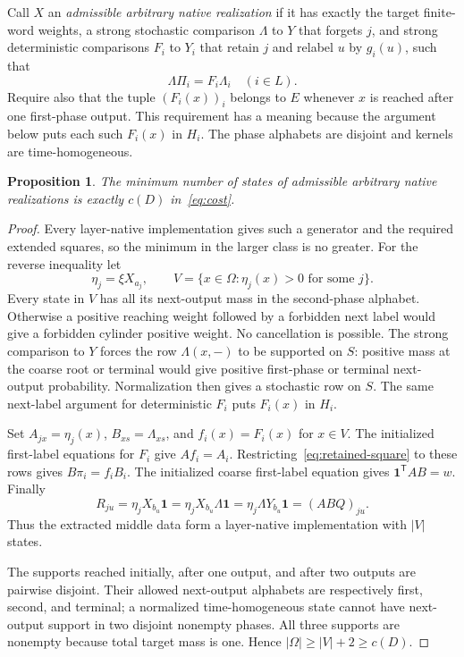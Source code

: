 \documentclass[11pt]{article}
\newcommand{\one}{\mathbf 1}
\newtheorem{proposition}[theorem]{Proposition}
\theoremstyle{remark}
\begin{document}
Call $X$ an \emph{admissible arbitrary native realization} if it has exactly the target finite-word weights, a strong stochastic comparison $\Lambda$ to $Y$ that forgets $j$, and strong deterministic comparisons $F_i$ to $Y_i$ that retain $j$ and relabel $u$ by $g_i(u)$, such that
\begin{equation}\label{eq:retained-square}
 \Lambda\Pi_i=F_i\Lambda_i\quad(i\in L).
\end{equation}
Require also that the tuple $(F_i(x))_i$ belongs to $E$ whenever $x$ is reached after one first-phase output. This requirement has a meaning because the argument below puts each such $F_i(x)$ in $H_i$. The phase alphabets are disjoint and kernels are time-homogeneous.

\begin{proposition}\label{prop:arbitrary-native}
The minimum number of states of admissible arbitrary native realizations is exactly $c(D)$ in~\eqref{eq:cost}.
\end{proposition}
\begin{proof}
Every layer-native implementation gives such a generator and the required extended squares, so the minimum in the larger class is no greater. For the reverse inequality let
\[
 \eta_j=\xi X_{a_j},\qquad
 V=\{x\in\Omega:\eta_j(x)>0\text{ for some }j\}.
\]
Every state in $V$ has all its next-output mass in the second-phase alphabet. Otherwise a positive reaching weight followed by a forbidden next label would give a forbidden cylinder positive weight. No cancellation is possible. The strong comparison to $Y$ forces the row $\Lambda(x,-)$ to be supported on $S$: positive mass at the coarse root or terminal would give positive first-phase or terminal next-output probability. Normalization then gives a stochastic row on $S$. The same next-label argument for deterministic $F_i$ puts $F_i(x)$ in $H_i$.

Set $A_{jx}=\eta_j(x)$, $B_{xs}=\Lambda_{xs}$, and $f_i(x)=F_i(x)$ for $x\in V$. The initialized first-label equations for $F_i$ give $Af_i=A_i$. Restricting~\eqref{eq:retained-square} to these rows gives $B\pi_i=f_iB_i$. The initialized coarse first-label equation gives $\one^{\mathsf T}AB=w$. Finally
\[
 R_{ju}=\eta_jX_{b_u}\one
 =\eta_jX_{b_u}\Lambda\one
 =\eta_j\Lambda Y_{b_u}\one
 =(ABQ)_{ju}.
\]
Thus the extracted middle data form a layer-native implementation with $|V|$ states.

The supports reached initially, after one output, and after two outputs are pairwise disjoint. Their allowed next-output alphabets are respectively first, second, and terminal; a normalized time-homogeneous state cannot have next-output support in two disjoint nonempty phases. All three supports are nonempty because total target mass is one. Hence $|\Omega|\ge |V|+2\ge c(D)$.
\end{proof}
\end{document}
